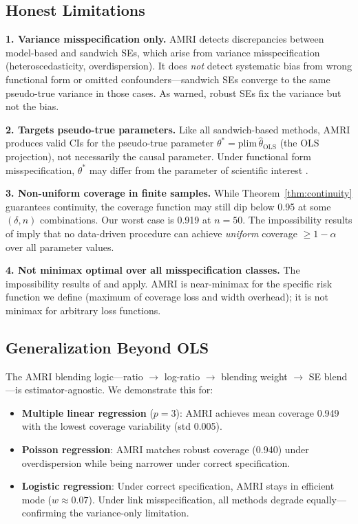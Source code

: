 \documentclass[12pt]{article}
\theoremstyle{definition}
\theoremstyle{remark}
\begin{document}
\subsection{Honest Limitations}

\textbf{1. Variance misspecification only.} AMRI detects discrepancies between model-based and sandwich SEs, which arise from variance misspecification (heteroscedasticity, overdispersion). It does \emph{not} detect systematic bias from wrong functional form or omitted confounders---sandwich SEs converge to the same pseudo-true variance in those cases. As \citet{freedman2006so} warned, robust SEs fix the variance but not the bias.

\textbf{2. Targets pseudo-true parameters.} Like all sandwich-based methods, AMRI produces valid CIs for the pseudo-true parameter $\theta^* = \mathrm{plim}\, \hat\theta_{\mathrm{OLS}}$ (the OLS projection), not necessarily the causal parameter. Under functional form misspecification, $\theta^*$ may differ from the parameter of scientific interest \citep{buja2019models}.

\textbf{3. Non-uniform coverage in finite samples.} While Theorem~\ref{thm:continuity} guarantees continuity, the coverage function may still dip below 0.95 at some $(\delta, n)$ combinations. Our worst case is 0.919 at $n = 50$. The impossibility results of \citet{leeb2005model} imply that no data-driven procedure can achieve \emph{uniform} coverage $\geq 1 - \alpha$ over all parameter values.

\textbf{4. Not minimax optimal over all misspecification classes.} The impossibility results of \citet{low1997nonparametric} and \citet{armstrong2018optimal} apply. AMRI is near-minimax for the specific risk function we define (maximum of coverage loss and width overhead); it is not minimax for arbitrary loss functions.

\subsection{Generalization Beyond OLS}

The AMRI blending logic---ratio $\to$ log-ratio $\to$ blending weight $\to$ SE blend---is estimator-agnostic. We demonstrate this for:
\begin{itemize}[nosep]
\item \textbf{Multiple linear regression} ($p = 3$): AMRI achieves mean coverage 0.949 with the lowest coverage variability (std 0.005).
\item \textbf{Poisson regression}: AMRI matches robust coverage (0.940) under overdispersion while being narrower under correct specification.
\item \textbf{Logistic regression}: Under correct specification, AMRI stays in efficient mode ($w \approx 0.07$). Under link misspecification, all methods degrade equally---confirming the variance-only limitation.
\end{itemize}
\end{document}
